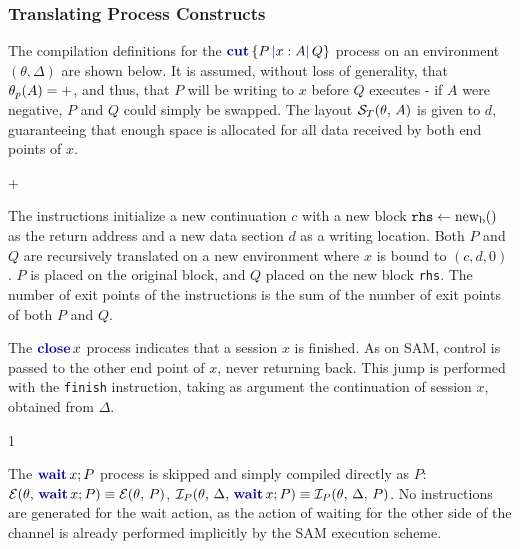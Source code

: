 \documentclass[sigconf,nonacm,natbib=true]{acmart}
\begin{document}
\subsubsection{Translating Process Constructs}

The compilation definitions for the $\cutc{P}{x:A}{Q}$ process on an environment $(\theta, \Delta)$ are shown below. It is assumed, without loss of generality, that $\theta_{p}(A) = +$, and thus, that $P$ will be writing to $x$ before $Q$ executes - if $A$ were negative, $P$ and $Q$ could simply be swapped. The layout $\mathcal{S}_T(\theta,\,A)$ is given to $d$, guaranteeing that enough space is allocated for all data received by both end points of $x$.
\begin{compilationacm}{\theta}{\Delta}{}
{ + }
\end{compilationacm}

The instructions initialize a new continuation $c$ with a new block $\texttt{rhs} \leftarrow \text{new}_{\text{b}}()$ as the return address and a new data section $d$ as a writing location. Both $P$ and $Q$ are recursively translated on a new environment where $x$ is bound to $(c, d, 0)$. $P$ is placed on the original block, and $Q$ placed on the new block \texttt{rhs}. The number of exit points of the instructions is the sum of the number of exit points of both $P$ and $Q$. 

The $\closec{x}$ process indicates that a session $x$ is finished. As on \ac{SAM}, control is passed to the other end point of $x$, never returning back. This jump is performed with the \texttt{finish} instruction, taking as argument the continuation of session $x$, obtained from $\Delta$.
\begin{compilationacm}{\theta}{\Delta}{}{1}
\end{compilationacm}

The $\waitc{x}{P}$ process is skipped and simply compiled directly as $P$: $\getendpoints{\theta}{\waitc{x}{P}} \equiv \getendpoints{\theta}{P}$, $\getinstructions{\theta}{\Delta}{\waitc{x}{P}} \equiv \getinstructions{\theta}{\Delta}{P}$. No instructions are generated for the wait action, as the action of waiting for the other side of the channel is already performed implicitly by the \ac{SAM} execution scheme.
\end{document}
